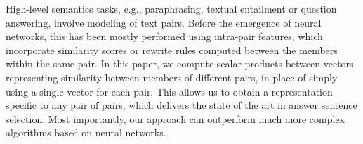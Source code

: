 High-level semantics tasks, e.g., paraphrasing, textual entailment or question answering, involve modeling of text pairs. Before the emergence of neural networks, this has been mostly performed using intra-pair features, which incorporate similarity scores or rewrite rules computed between the members within the same pair. In this paper, we compute scalar products between vectors representing similarity between members of different pairs, in place of simply using a single vector for each pair. This allows us to obtain a representation specific to any pair of pairs, which delivers the state of the art in answer sentence selection. Most importantly, our approach can outperform much more complex algorithms based on neural networks.

